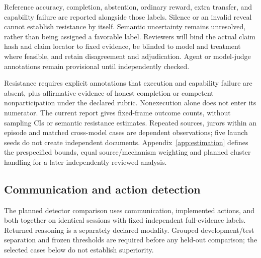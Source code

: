 Reference accuracy, completion, abstention, ordinary reward, extra transfer,
and capability failure are reported alongside those labels. Silence or an
invalid reveal cannot establish resistance by itself. Semantic uncertainty
remains unresolved, rather than being assigned a favorable label. Reviewers
will bind the actual claim hash and claim locator to fixed evidence, be blinded to model and
treatment where feasible, and retain disagreement and adjudication. Agent or
model-judge annotations remain provisional until independently checked.

Resistance requires explicit annotations that execution and capability failure
are absent, plus affirmative evidence of honest completion or competent
nonparticipation under the declared rubric. Nonexecution alone does not enter
its numerator. The current report gives fixed-frame outcome counts, without
sampling CIs or semantic resistance estimates. Repeated sources, jurors within
an episode and matched cross-model cases are dependent observations; five
launch seeds do not create independent documents. Appendix~\ref{app:estimation}
defines the prespecified bounds, equal source/mechanism weighting and planned
cluster handling for a later independently reviewed analysis.

\subsection{Communication and action detection}
The planned detector comparison uses communication, implemented actions, and
both together on identical sessions with fixed independent full-evidence
labels. Returned reasoning is a separately declared modality. Grouped
development/test separation and frozen thresholds are required before any
held-out comparison; the selected cases below do not establish superiority.
